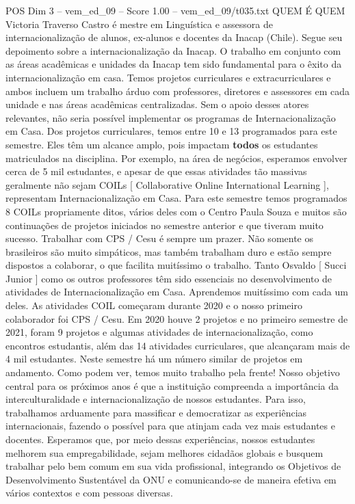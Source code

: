 \begin{textsample}{POS Dim 3 – vem\_ed\_09 – Score 1.00 – vem\_ed\_09/t035.txt}  \label{ex:f3_pos_059}
QUEM É QUEM Victoria Traverso Castro é mestre em Linguística e assessora de internacionalização de alunos, ex-alunos e docentes da Inacap (Chile).
Segue seu depoimento sobre a internacionalização da Inacap.
O trabalho em conjunto com as áreas acadêmicas e unidades da Inacap tem sido fundamental para o êxito da internacionalização em casa.
Temos projetos curriculares e extracurriculares e ambos incluem um trabalho árduo com professores, diretores e assessores em cada unidade e nas áreas acadêmicas centralizadas.
Sem o apoio desses atores relevantes, não seria possível implementar os programas de Internacionalização em Casa.
Dos projetos curriculares, temos entre 10 e 13 programados para este semestre.
Eles têm um alcance amplo, pois impactam \textbf{todos} os estudantes matriculados na disciplina.
Por exemplo, na área de negócios, esperamos envolver cerca de 5 mil estudantes, e apesar de que essas atividades tão massivas geralmente não sejam COILs [ Collaborative Online International Learning ], representam Internacionalização em Casa.
Para este semestre temos programados 8 COILs propriamente ditos, vários deles com o Centro Paula Souza e muitos são continuações de projetos iniciados no semestre anterior e que tiveram muito sucesso.
Trabalhar com CPS / Cesu é sempre um prazer.
Não somente os brasileiros são muito simpáticos, mas também trabalham duro e estão sempre dispostos a colaborar, o que facilita muitíssimo o trabalho.
Tanto Osvaldo [ Succi Junior ] como os outros professores têm sido essenciais no desenvolvimento de atividades de Internacionalização em Casa.
Aprendemos muitíssimo com cada um deles.
As atividades COIL começaram durante 2020 e o nosso primeiro colaborador foi CPS / Cesu.
Em 2020 houve 2 projetos e no primeiro semestre de 2021, foram 9 projetos e algumas atividades de internacionalização, como encontros estudantis, além das 14 atividades curriculares, que alcançaram mais de 4 mil estudantes.
Neste semestre há um número similar de projetos em andamento.
Como podem ver, temos muito trabalho pela frente!
Nosso objetivo central para os próximos anos é que a instituição compreenda a importância da interculturalidade e internacionalização de nossos estudantes.
Para isso, trabalhamos arduamente para massificar e democratizar as experiências internacionais, fazendo o possível para que atinjam cada vez mais estudantes e docentes.
Esperamos que, por meio dessas experiências, nossos estudantes melhorem sua empregabilidade, sejam melhores cidadãos globais e busquem trabalhar pelo bem comum em sua vida profissional, integrando os Objetivos de Desenvolvimento Sustentável da ONU e comunicando-se de maneira efetiva em vários contextos e com pessoas diversas.

\end{textsample}
